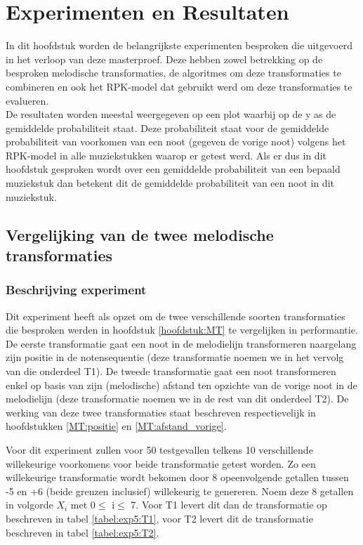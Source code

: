 \chapter{Experimenten en Resultaten}
\label{hoofdstuk:ER}
In dit hoofdstuk worden de belangrijkste experimenten besproken die uitgevoerd in het verloop van deze masterproef. Deze hebben zowel betrekking op de besproken melodische transformaties, de algoritmes om deze transformaties te combineren en ook het RPK-model dat gebruikt werd om deze transformaties te evalueren.\\
De resultaten worden meestal weergegeven op een plot waarbij op de y as de gemiddelde probabiliteit staat. Deze probabiliteit staat voor de gemiddelde probabiliteit van voorkomen van een noot (gegeven de vorige noot) volgens het RPK-model in alle muziekstukken waarop er getest werd. Als er dus in dit hoofdstuk gesproken wordt over een gemiddelde probabiliteit van een bepaald muziekstuk dan betekent dit de gemiddelde probabiliteit van een noot in dit muziekstuk.

\section{Vergelijking van de twee melodische transformaties}
\label{experiment:5}
\subsection{Beschrijving experiment}
Dit experiment heeft als opzet om de twee verschillende soorten transformaties die besproken werden in hoofdstuk \ref{hoofdstuk:MT} te vergelijken in performantie. De eerste transformatie gaat een noot in de melodielijn transformeren naargelang zijn positie in de notensequentie (deze transformatie noemen we in het vervolg van die onderdeel T1). De tweede transformatie gaat een noot transformeren enkel op basis van zijn (melodische) afstand ten opzichte van de vorige noot in de melodielijn (deze transformatie noemen we in de rest van dit onderdeel T2). De werking van deze twee transformaties staat beschreven respectievelijk in hoofdstukken \ref{MT:positie} en \ref{MT:afstand_vorige}.

Voor dit experiment zullen voor 50 testgevallen telkens 10 verschillende willekeurige voorkomens voor beide transformatie getest worden. Zo een willekeurige transformatie wordt bekomen door 8 opeenvolgende getallen tussen -5 en +6 (beide grenzen inclusief) willekeurig te genereren. Noem deze 8 getallen in volgorde $X_{i}$ met 0$\leq$ i$\leq$ 7. Voor T1 levert dit dan de transformatie op beschreven in tabel \ref{tabel:exp5:T1}, voor T2 levert dit de transformatie beschreven in tabel \ref{tabel:exp5:T2}.


